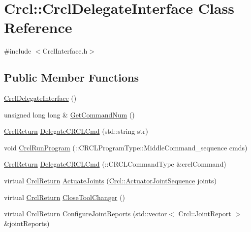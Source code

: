 \hypertarget{classCrcl_1_1CrclDelegateInterface}{\section{Crcl\-:\-:Crcl\-Delegate\-Interface Class Reference}
\label{classCrcl_1_1CrclDelegateInterface}
}


{\ttfamily \#include $<$Crcl\-Interface.\-h$>$}

\subsection*{Public Member Functions}
\begin{DoxyCompactItemize}
\item 
\hyperlink{classCrcl_1_1CrclDelegateInterface_ab6dab41e2398ed9a2cd2ac58e4c00ea2}{Crcl\-Delegate\-Interface} ()
\item 
unsigned long long \& \hyperlink{classCrcl_1_1CrclDelegateInterface_a352a54f3e006b3daecdf5d37ff6ca4bc}{Get\-Command\-Num} ()
\item 
\hyperlink{namespaceCrcl_a1ed3b29723118a020251dde9b12733c0}{Crcl\-Return} \hyperlink{classCrcl_1_1CrclDelegateInterface_a53be7c01e92e61e2be19e535e307ba41}{Delegate\-C\-R\-C\-L\-Cmd} (std\-::string str)
\item 
void \hyperlink{classCrcl_1_1CrclDelegateInterface_a0c0209dd04c5e99e13c546b99a672ce4}{Crcl\-Run\-Program} (\-::C\-R\-C\-L\-Program\-Type\-::\-Middle\-Command\-\_\-sequence cmds)
\item 
\hyperlink{namespaceCrcl_a1ed3b29723118a020251dde9b12733c0}{Crcl\-Return} \hyperlink{classCrcl_1_1CrclDelegateInterface_a7513484f2c0d14332f844bdbae2c0586}{Delegate\-C\-R\-C\-L\-Cmd} (\-::C\-R\-C\-L\-Command\-Type \&crcl\-Command)
\item 
virtual \hyperlink{namespaceCrcl_a1ed3b29723118a020251dde9b12733c0}{Crcl\-Return} \hyperlink{classCrcl_1_1CrclDelegateInterface_a5e666cfdbbaee53ddead4035cda12399}{Actuate\-Joints} (\hyperlink{namespaceCrcl_af084766e8e2d38a135cc67ef54d9904d}{Crcl\-::\-Actuator\-Joint\-Sequence} joints)
\item 
virtual \hyperlink{namespaceCrcl_a1ed3b29723118a020251dde9b12733c0}{Crcl\-Return} \hyperlink{classCrcl_1_1CrclDelegateInterface_a3c8fc025f6c0eba5609b3e0866810651}{Close\-Tool\-Changer} ()
\item 
virtual \hyperlink{namespaceCrcl_a1ed3b29723118a020251dde9b12733c0}{Crcl\-Return} \hyperlink{classCrcl_1_1CrclDelegateInterface_a41d9d47da2cb9463fe258903c7c8ed62}{Configure\-Joint\-Reports} (std\-::vector$<$ \hyperlink{structCrcl_1_1JointReport}{Crcl\-::\-Joint\-Report} $>$ \&joint\-Reports)

\end{DoxyCompactItemize}
